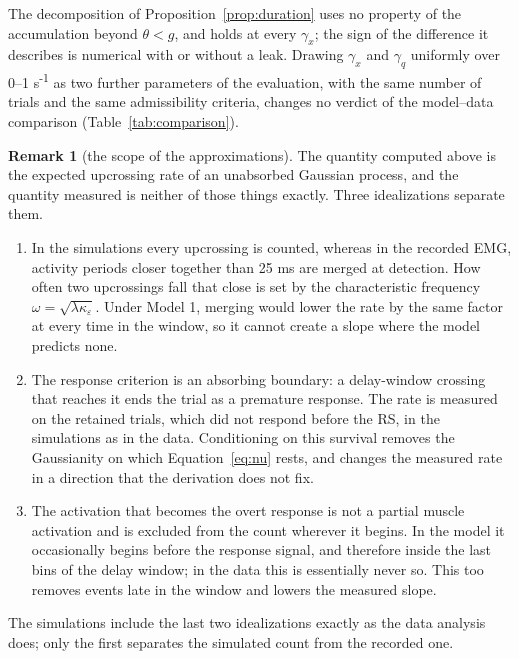 \documentclass[a4paper,11pt]{article}
\theoremstyle{definition}
\newtheorem{remark}[proposition]{Remark}
\newcommand{\1}{\mathbbm{1}}
\begin{document}
The decomposition of Proposition~\ref{prop:duration} uses no property of the accumulation beyond $\theta <g$, and holds at every ${\gamma }_{x}$; the sign of the difference it describes is numerical with or without a leak. Drawing ${\gamma }_{x}$ and ${\gamma }_{q}$ uniformly over 0--1 s\textsuperscript{-1} as two further parameters of the evaluation, with the same number of trials and the same admissibility criteria, changes no verdict of the model--data comparison (Table~\ref{tab:comparison}).


\begin{remark}[the scope of the approximations]\label{rem:scope}
The quantity computed above is the expected upcrossing rate of an unabsorbed Gaussian process, and the quantity measured is neither of those things exactly. Three idealizations separate them.
\begin{enumerate}
\item In the simulations every upcrossing is counted, whereas in the recorded EMG, activity periods closer together than 25 ms are merged at detection. How often two upcrossings fall that close is set by the characteristic frequency $\omega =\sqrt{\lambda \kappa_{\varepsilon} }$. Under Model 1, merging would lower the rate by the same factor at every time in the window, so it cannot create a slope where the model predicts none.
\item The response criterion is an absorbing boundary: a delay-window crossing that reaches it ends the trial as a premature response. The rate is measured on the retained trials, which did not respond before the RS, in the simulations as in the data. Conditioning on this survival removes the Gaussianity on which Equation~\eqref{eq:nu} rests, and changes the measured rate in a direction that the derivation does not fix.
\item The activation that becomes the overt response is not a partial muscle activation and is excluded from the count wherever it begins. In the model it occasionally begins before the response signal, and therefore inside the last bins of the delay window; in the data this is essentially never so. This too removes events late in the window and lowers the measured slope.
\end{enumerate}
\end{remark}
The simulations include the last two idealizations exactly as the data analysis does; only the first separates the simulated count from the recorded one.
\end{document}
